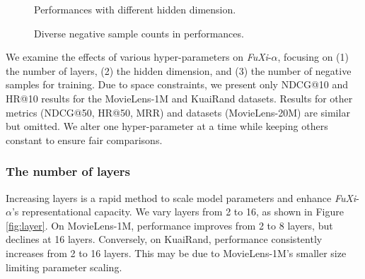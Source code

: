 \begin{figure}[t]
    \centering    
    \setlength{\abovecaptionskip}{0mm}
    \setlength{\belowcaptionskip}{-10pt}
    \caption{Performances with different hidden dimension.}     
    \label{fig:dimension}     
\end{figure}

\begin{figure}[ht]
\centering
\setlength{\abovecaptionskip}{0pt}
\setlength{\belowcaptionskip}{0pt}
\caption{Diverse negative sample counts in performances.
}
\label{fig:negative}
\end{figure}

We examine the effects of various hyper-parameters on \textit{FuXi}-$\alpha$, focusing on (1) the number of layers, (2) the hidden dimension, and (3) the number of negative samples for training. Due to space constraints, we present only NDCG@10 and HR@10 results for the MovieLens-1M and KuaiRand datasets. Results for other metrics (NDCG@50, HR@50, MRR) and datasets (MovieLens-20M) are similar but omitted. We alter one hyper-parameter at a time while keeping others constant to ensure fair comparisons.

\subsubsection{The number of layers}
Increasing layers is a rapid method to scale model parameters and enhance \textit{FuXi}-$\alpha$'s representational capacity. We vary layers from 2 to 16, as shown in Figure \ref{fig:layer}. On MovieLens-1M, performance improves from 2 to 8 layers, but declines at 16 layers. Conversely, on KuaiRand, performance consistently increases from 2 to 16 layers. This may be due to MovieLens-1M's smaller size limiting parameter scaling.


